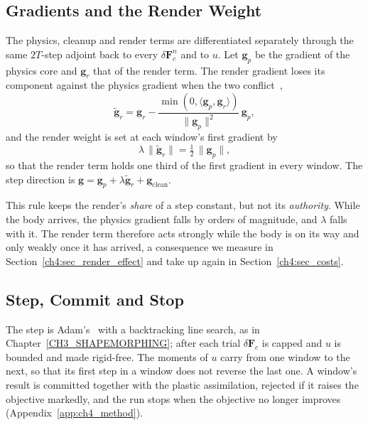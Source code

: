 \subsection{Gradients and the Render Weight}
\label{ch4:sec_lambda}
The physics, cleanup and render terms are differentiated separately through the same $2T$-step adjoint back to every
$\delta\mathbf{F}^n_{c}$ and to $u$. Let $\mathbf{g}_p$ be the gradient of the physics core and $\mathbf{g}_r$ that of the
render term. The render gradient loses its component against the physics gradient when the two
conflict~\citep{yu2020pcgrad},
\begin{equation}
\tilde{\mathbf{g}}_r=\mathbf{g}_r-\frac{\min(0,\langle\mathbf{g}_p,\mathbf{g}_r\rangle)}{\lVert\mathbf{g}_p\rVert^{2}}\,\mathbf{g}_p ,
\end{equation}
and the render weight is set at each window's first gradient by
\begin{equation}
\label{ch4:eq_lambda}
\lambda\,\lVert\tilde{\mathbf{g}}_r\rVert=\tfrac12\,\lVert\mathbf{g}_p\rVert ,
\end{equation}
so that the render term holds one third of the first gradient in every window. The step direction is
$\mathbf{g}=\mathbf{g}_p+\lambda\tilde{\mathbf{g}}_r+\mathbf{g}_{\mathrm{clean}}$.

This rule keeps the render's \emph{share} of a step constant, but not its \emph{authority}. While the body arrives, the
physics gradient falls by orders of magnitude, and $\lambda$ falls with it. The render term therefore acts strongly while
the body is on its way and only weakly once it has arrived, a consequence we measure in
Section~\ref{ch4:sec_render_effect} and take up again in Section~\ref{ch4:sec_costs}.

\subsection{Step, Commit and Stop}
The step is Adam's~\citep{kingma2017adammethodstochasticoptimization} with a backtracking line search, as in
Chapter~\ref{CH3_SHAPEMORPHING}; after each trial $\delta\mathbf{F}_c$ is capped and $u$ is bounded and made rigid-free.
The moments of $u$ carry from one window to the next, so that its first step in a window does not reverse the last one.
A window's result is committed together with the plastic assimilation, rejected if it raises the objective markedly, and
the run stops when the objective no longer improves (Appendix~\ref{app:ch4_method}).

